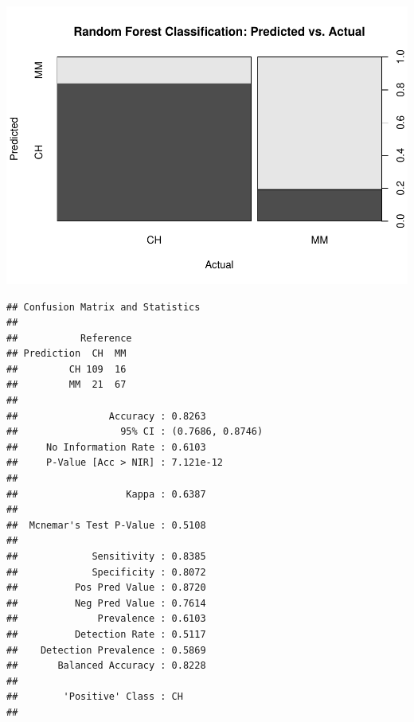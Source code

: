 \documentclass[]{book}
\newenvironment{Shaded}{\begin{snugshade}}{\end{snugshade}}
\newcommand{\DataTypeTok}[1]{\textcolor[rgb]{0.13,0.29,0.53}{#1}}
\newcommand{\KeywordTok}[1]{\textcolor[rgb]{0.13,0.29,0.53}{\textbf{#1}}}
\newcommand{\NormalTok}[1]{#1}
\newcommand{\OperatorTok}[1]{\textcolor[rgb]{0.81,0.36,0.00}{\textbf{#1}}}
\newcommand{\StringTok}[1]{\textcolor[rgb]{0.31,0.60,0.02}{#1}}
\begin{document}
\includegraphics{data-sci_files/figure-latex/unnamed-chunk-81-2.pdf}

\begin{Shaded}
\end{Shaded}

\begin{verbatim}
## Confusion Matrix and Statistics
## 
##           Reference
## Prediction  CH  MM
##         CH 109  16
##         MM  21  67
##                                           
##                Accuracy : 0.8263          
##                  95% CI : (0.7686, 0.8746)
##     No Information Rate : 0.6103          
##     P-Value [Acc > NIR] : 7.121e-12       
##                                           
##                   Kappa : 0.6387          
##                                           
##  Mcnemar's Test P-Value : 0.5108          
##                                           
##             Sensitivity : 0.8385          
##             Specificity : 0.8072          
##          Pos Pred Value : 0.8720          
##          Neg Pred Value : 0.7614          
##              Prevalence : 0.6103          
##          Detection Rate : 0.5117          
##    Detection Prevalence : 0.5869          
##       Balanced Accuracy : 0.8228          
##                                           
##        'Positive' Class : CH              
## 
\end{verbatim}
\end{document}
